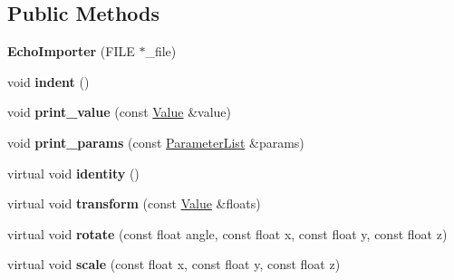 \subsection*{Public Methods}
\begin{DoxyCompactItemize}
\item 
\mbox{\label{structpbrt_1_1_echo_importer_ad0916c662b697706bac992cd61dc9208}} 
{\bfseries Echo\+Importer} (F\+I\+LE $\ast$\+\_\+file)
\item 
\mbox{\label{structpbrt_1_1_echo_importer_a88bb39b65c2e091a2b915541238fd778}} 
void {\bfseries indent} ()
\item 
\mbox{\label{structpbrt_1_1_echo_importer_a546785ee98b61eed5f78f43253a1ee16}} 
void {\bfseries print\+\_\+value} (const \hyperlink{structpbrt_1_1_value}{Value} \&value)
\item 
\mbox{\label{structpbrt_1_1_echo_importer_ac3177f8b750c4fc77c95e672867a9b32}} 
void {\bfseries print\+\_\+params} (const \hyperlink{structpbrt_1_1_parameter_list}{Parameter\+List} \&params)
\item 
\mbox{\label{structpbrt_1_1_echo_importer_acb96f05ba33450e2411e4ff49b55b67d}} 
virtual void {\bfseries identity} ()
\item 
\mbox{\label{structpbrt_1_1_echo_importer_a6e1b3bb1f50a0ccca5dcece6775d2ab2}} 
virtual void {\bfseries transform} (const \hyperlink{structpbrt_1_1_value}{Value} \&floats)
\item 
\mbox{\label{structpbrt_1_1_echo_importer_a415aef104f409f3043ee2d3bef1abadf}} 
virtual void {\bfseries rotate} (const float angle, const float x, const float y, const float z)
\item 
\mbox{\label{structpbrt_1_1_echo_importer_af38d0e57653a91e48fc549d1ebab73b2}} 
virtual void {\bfseries scale} (const float x, const float y, const float z)
\item 
\mbox{\label{structpbrt_1_1_echo_importer_a6b14bae12f837ee0012c172c01c7bca8}} 

\end{DoxyCompactItemize}

